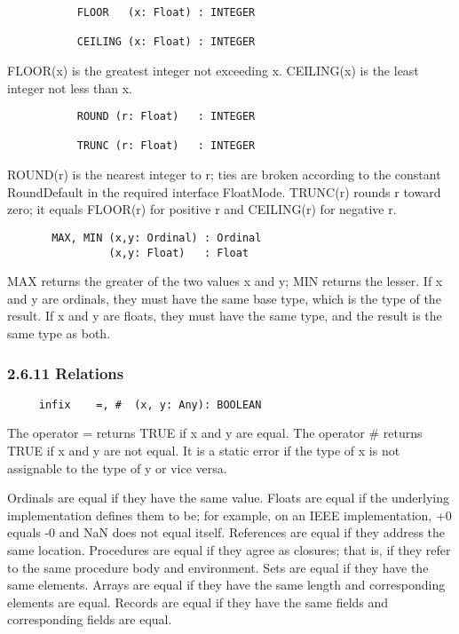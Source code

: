 \documentclass[10pt]{article}
\begin{document}
\begin{verbatim}
           FLOOR   (x: Float) : INTEGER

           CEILING (x: Float) : INTEGER
\end{verbatim}
FLOOR(x) is the greatest integer not exceeding x.  CEILING(x) is the least
integer not less than x.

\begin{verbatim}
           ROUND (r: Float)   : INTEGER

           TRUNC (r: Float)   : INTEGER
\end{verbatim}
ROUND(r) is the nearest integer to r; ties are broken according to the
constant RoundDefault in the required interface FloatMode.  TRUNC(r) rounds r
toward zero; it equals FLOOR(r) for positive r and CEILING(r) for negative r.

\begin{verbatim}
       MAX, MIN (x,y: Ordinal) : Ordinal
                (x,y: Float)   : Float
\end{verbatim}
MAX returns the greater of the two values x and y; MIN returns the lesser.  If
x and y are ordinals, they must have the same base type, which is the type of
the result.  If x and y are floats, they must have the same type, and the
result is the same type as both.

\subsubsection*{2.6.11 Relations}

\begin{verbatim}
     infix    =, #  (x, y: Any): BOOLEAN
\end{verbatim}
The operator = returns TRUE if x and y are equal.  The operator \# returns TRUE
if x and y are not equal.  It is a static error if the type of x is not
assignable to the type of y or vice versa.

Ordinals are equal if they have the same value.  Floats are equal if the
underlying implementation defines them to be; for example, on an IEEE
implementation, +0 equals -0 and NaN does not equal itself.  References are
equal if they address the same location.  Procedures are equal if they agree as
closures; that is, if they refer to the same procedure body and
environment.  Sets are equal if they have the same elements.  Arrays are equal
if they have the same length and corresponding elements are equal.  Records are
equal if they have the same fields and corresponding fields are equal.
\end{document}
